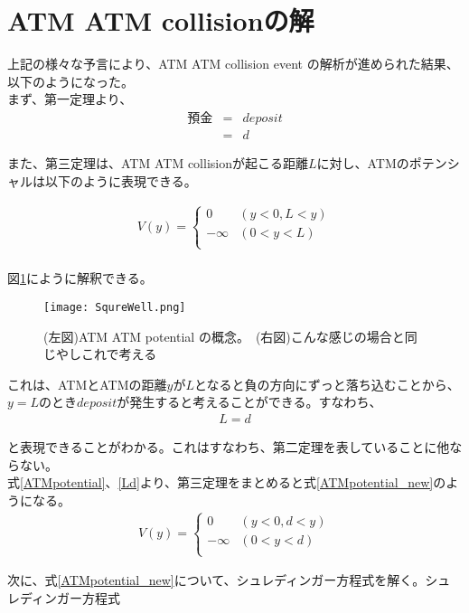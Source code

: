 \section{ATM ATM collisionの解}
上記の様々な予言により、ATM ATM collision event の解析が進められた結果、以下のようになった。\\
まず、第一定理より、
\begin{eqnarray}
預金 &=& deposit\nonumber\\
&=& d
\end{eqnarray}

また、第三定理は、ATM ATM collisionが起こる距離$L$に対し、ATMのポテンシャルは以下のように表現できる。

\begin{eqnarray}
V(y)=\left\{ \begin{array}{ll}
0 & (y<0,  L<y) \\
-\infty & (0<y<L) \\
\end{array} \right.
\label{ATMpotential}
\end{eqnarray}
\\
図\ref{SqureWell}にように解釈できる。

\begin{figure}[H]
\centering
\texttt{[image: SqureWell.png]}
\caption{(左図)ATM ATM potential の概念。\
(右図)こんな感じの場合と同じやしこれで考える}
\label{SqureWell}
\end{figure}

これは、ATMとATMの距離$y$が$L$となると負の方向にずっと落ち込むことから、$y=L$のとき$deposit$が発生すると考えることができる。すなわち、
\begin{eqnarray}
L = d
\label{Ld}
\end{eqnarray}

と表現できることがわかる。これはすなわち、第二定理を表していることに他ならない。\\
式\ref{ATMpotential}、\ref{Ld}より、第三定理をまとめると式\ref{ATMpotential_new}のようになる。
\begin{eqnarray}
V(y)=\left\{ \begin{array}{ll}
0 & (y<0,  d<y) \\
-\infty & (0<y<d) \\
\end{array} \right.
\label{ATMpotential_new}
\end{eqnarray}

次に、式\ref{ATMpotential_new}について、シュレディンガー方程式を解く。シュレディンガー方程式

